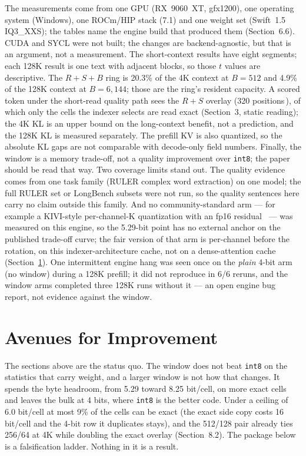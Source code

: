 \documentclass[10pt,twocolumn]{article}
\begin{document}
The measurements come from one GPU (RX~9060~XT, gfx1200), one operating system (Windows), one ROCm/HIP stack (7.1) and one weight set (Swift~1.5 IQ3\_XXS); the tables name the engine build that produced them (Section~6.6). CUDA and SYCL were not built; the changes are backend-agnostic, but that is an argument, not a measurement. The short-context results have eight segments; each 128K result is one text with adjacent blocks, so those $t$ values are descriptive. The $R{+}S{+}B$ ring is 20.3\% of the 4K context at $B{=}512$ and 4.9\% of the 128K context at $B{=}6{,}144$; those are the ring's resident capacity. A scored token under the short-read quality path sees the $R{+}S$ overlay (320 positions\,\cite{strata-wp}), of which only the cells the indexer selects are read exact (Section~3, static reading); the 4K KL is an upper bound on the long-context benefit, not a prediction, and the 128K KL is measured separately. The prefill KV is also quantized, so the absolute KL gaps are not comparable with decode-only field numbers. Finally, the window is a memory trade-off, not a quality improvement over \texttt{int8}; the paper should be read that way. Two coverage limits stand out. The quality evidence comes from one task family (RULER complex word extraction) on one model; the full RULER set or LongBench subsets were not run, so the quality sentences here carry no claim outside this family. And no community-standard arm --- for example a KIVI-style per-channel-K quantization with an fp16 residual~\cite{kivi,kvquant} --- was measured on this engine, so the 5.29-bit point has no external anchor on the published trade-off curve; the fair version of that arm is per-channel before the rotation, on this indexer-architecture cache, not on a dense-attention cache (Section~\ref{sec:followup}). One intermittent engine hang was seen once on the \emph{plain} 4-bit arm (no window) during a 128K prefill; it did not reproduce in 6/6 reruns, and the window arms completed three 128K runs without it --- an open engine bug report, not evidence against the window.

\section{Avenues for Improvement}\label{sec:followup}

The sections above are the status quo. The window does not beat \texttt{int8} on the statistics that carry weight, and a larger window is not how that changes. It spends the byte headroom, from 5.29 toward 8.25 bit/cell, on more exact cells and leaves the bulk at 4 bits, where \texttt{int8} is the better code. Under a ceiling of 6.0 bit/cell at most 9\% of the cells can be exact (the exact side copy costs 16 bit/cell and the 4-bit row it duplicates stays), and the 512/128 pair already ties 256/64 at 4K while doubling the exact overlay (Section~8.2). The package below is a falsification ladder. Nothing in it is a result.
\end{document}
